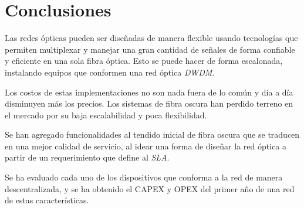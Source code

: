\section{Conclusiones}\label{sec:conclusiones}

Las redes ópticas pueden ser diseñadas de manera flexible usando
tecnologías que permiten multiplexar y manejar una gran cantidad de
señales de forma confiable y eficiente en una sola fibra óptica. Esto
se puede hacer de forma escalonada, instalando equipos que conformen
una red óptica \emph{DWDM}.

Los costos de estas implementaciones no son nada fuera de lo común y
día a día disminuyen más los precios. Los sistemas de fibra oscura han
perdido terreno en el mercado por su baja escalabilidad y poca
flexibilidad.

Se han agregado funcionalidades al tendido inicial de fibra oscura que
se traducen en una mejor calidad de servicio, al idear una forma de
diseñar la red óptica a partir de un requerimiento que define al
\emph{SLA}.

Se ha evaluado cada uno de los dispositivos que conforma a la red de
manera descentralizada, y se ha obtenido el CAPEX y OPEX del primer
año de una red de estas características.
